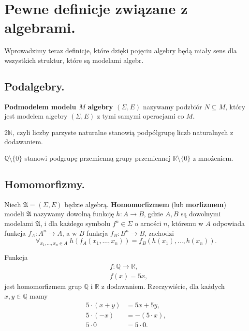 \section{Pewne definicje związane z algebrami.}

Wprowadzimy teraz definicje,
	które dzięki pojęciu algebry będą miały sens dla wszystkich struktur,
	które są modelami algebr.

\subsection{Podalgebry.}

\begin{definition}
    \textbf{Podmodelem modelu $M$ algebry $(\Sigma, E)$} nazywamy podzbiór $N \subseteq M$,
		który jest modelem algebry $(\Sigma, E)$ z tymi samymi operacjami co $M$.
\end{definition}

\begin{example}
	$2\mathbb{N}$, czyli liczby parzyste naturalne stanowią podpółgrupę liczb naturalnych z dodawaniem.
\end{example}
\begin{example}
	$\mathbb{Q} \setminus \{0\}$ stanowi podgrupę przemienną grupy przemiennej $\mathbb{R} \setminus \{0\}$ z mnożeniem.
\end{example}

\subsection{Homomorfizmy.}

\begin{definition}
    Niech $\mathfrak{A} = (\Sigma, E)$ będzie algebrą.
	\textbf{Homomorfizmem} (lub \textbf{morfizmem}) modeli $\mathfrak{A}$ nazywamy dowolną funkcję
		$h: A \to B$, gdzie $A, B$ są dowolnymi modelami $\mathfrak{A}$,
		i dla każdego symbolu $f^n \in \Sigma$ o arności $n$,
			któremu w $A$ odpowiada funkcja $f_A: A^n \to A$,
			a w $B$ funkcja $f_B: B^n \to B$,
		 zachodzi
	\begin{equation}
		\forall_{x_1, \dots, x_n \in A} \; h(f_A(x_1, \dots, x_n)) = f_B(h(x_1), \dots, h(x_n)).
	\end{equation}
\end{definition}

\begin{example}
	Funkcja
	\begin{align*}
		&f: \mathbb{Q} \to \mathbb{R},\\
		&f(x) = 5x,
	\end{align*}
	jest homomorfizmem grup $\mathbb{Q}$ i $\mathbb{R}$ z dodawaniem.
	Rzeczywiście, dla każdych $x, y \in \mathbb{Q}$ mamy
	\begin{align}
		5 \cdot (x + y) &= 5x + 5y, \\
		5 \cdot (-x) &= -(5 \cdot x), \\
		5 \cdot 0 &= 5 \cdot 0.
	\end{align}
\end{example}

